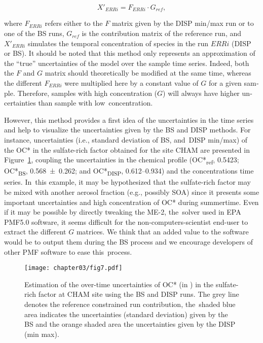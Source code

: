 \begin{otherlanguage}{english}
\begin{equation}
    X'_{ERRi} = F_{ERRi} \cdot G_{ref},
\end{equation}

where $F_{ERRi}$ refers either to the $F$ matrix given by the DISP min/max run or to one
of the BS runs, $G_{ref}$ is the contribution matrix of the reference run, and~$X'_{ERRi}$
simulates the temporal concentration of species in the run $ERRi$ (DISP or BS). It should
be noted that this method only represents an approximation of the ``true'' uncertainties
of the model over the sample time series. Indeed, both the $F$ and $G$ matrix should
theoretically be modified at the same time, whereas the different $F_{ERRi}$ were
multiplied here by a constant value of $G$ for a given sample.  Therefore, samples with
high concentration ($G$) will always have higher uncertainties than sample with
low~concentration.

However, this method provides a first idea of the uncertainties in the time series and
help to visualize the uncertainties given by the BS and DISP methods.  For instance,
uncertainties (i.e., standard deviation of BS, and~DISP min/max) of the OC* in the
sulfate-rich factor obtained for the site CHAM are presented in Figure~\ref{fig:fig7},
coupling the uncertainties in the chemical profile (OC*\textsubscript{ref},
\SI{0.5423}{\concum}; OC*\textsubscript{BS}, \SI{0.568\pm0.262}{\concum}; and
OC*\textsubscript{DISP}, \SIrange{0.612}{0.934}{\concum}) and the concentrations time
series. In~this example, it may be hypothesized that the sulfate-rich factor may be mixed
with another aerosol fraction (e.g., possibly SOA) since it presents some important
uncertainties and high concentration of OC* during summertime.  Even if it may be possible
by directly tweaking the ME-2, the~solver used in EPA PMF5.0 software, it seems difficult
for the non-computers-scientist end-user to extract the different $G$ matrices. We think
that an added value to the software would be to output them during the BS process and we
encourage developers of other PMF software to ease this~process.

\begin{figure}[ht]
    \centering
    \texttt{[image: chapter03/fig7.pdf]}
    \caption{
        Estimation of the over-time uncertainties of OC* (in \si{\concum}) in the
        sulfate-rich factor at CHAM site using the BS and DISP runs. The grey line denotes
        the reference constrained run contribution, the~shaded blue area indicates the
        uncertainties (standard deviation) given by the BS and the orange shaded area the
        uncertainties given by the DISP (min max).
    }
    \label{fig:fig7}
\end{figure}


\end{otherlanguage}
